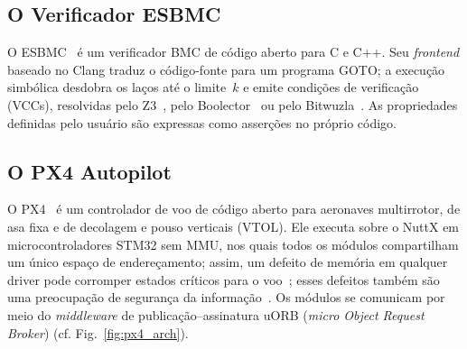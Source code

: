\documentclass[conference]{IEEEtran}
\begin{document}
\subsection{O Verificador ESBMC}
\label{subsec:esbmc}

O ESBMC~\cite{Cordeiro2012,Monteiro2022,Menezes2024} é um verificador
BMC de código aberto para C e C++.
Seu \textit{frontend} baseado no Clang traduz o código-fonte para um
programa GOTO; a execução simbólica desdobra os laços até o
limite~$k$ e emite condições de verificação (VCCs), resolvidas pelo
Z3~\cite{deMoura2008}, pelo Boolector~\cite{Brummayer2009} ou pelo
Bitwuzla~\cite{Niemetz2023}.
As propriedades definidas pelo usuário são expressas como asserções
no próprio código.

\subsection{O PX4 Autopilot}
\label{subsec:px4}

O PX4~\cite{PX4_GitHub,PX4_Documentation} é um controlador de voo de
código aberto para aeronaves multirrotor, de asa fixa e de decolagem
e pouso verticais (VTOL).
Ele executa sobre o NuttX em microcontroladores STM32 sem MMU, nos
quais todos os módulos compartilham um único espaço de endereçamento;
assim, um defeito de memória em qualquer driver pode corromper
estados críticos para o voo~\cite{PX4_Documentation}; esses defeitos
também são uma preocupação de segurança da
informação~\cite{Siddiqi2022}.
Os módulos se comunicam por meio do \textit{middleware} de
publicação--assinatura uORB (\textit{micro Object Request Broker})
(cf. Fig.~\ref{fig:px4_arch}).
\end{document}
